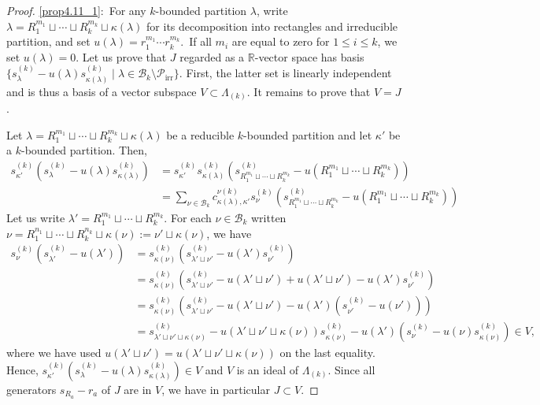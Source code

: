 \documentclass[ALCO,ThmDefs,Unicode,epreuves]{cedram}
\DeclareMathOperator{\irr}{irr}
\begin{document}
\begin{proof}
\eqref{prop4.11_1}:~For any $k$-bounded partition $\lambda$, write $\lambda=R_{1}^{m_{1}}%
\sqcup\cdots\sqcup R_{k}^{m_{k}}\sqcup\kappa(\lambda)$ for its decomposition into
rectangles and irreducible partition, and set $u(\lambda)=r_{1}^{m_{1}}\cdots
r_{k}^{m_{k}}$.\ If all $m_{i}$ are equal to zero for $1\leq i\leq k$, we set $u(\lambda)=0$. Let us prove that $J$ regarded as a $\mathbb{R}$-vector space has basis
$\{s_{\lambda}^{(k)}-u(\lambda)s_{\kappa(\lambda)}^{(k)}\mid\lambda\in \mathcal{B}_{k}\setminus \mathcal{P}_{\irr }\}$. First, the latter set is linearly independent and is thus a basis of a vector subspace $V\subset \Lambda_{(k)}$. It remains to prove that $V=J$. 

Let $\lambda=R_{1}^{m_{1}}%
\sqcup\cdots\sqcup R_{k}^{m_{k}}\sqcup\kappa(\lambda)$ be a reducible $k$-bounded partition and let $\kappa'$ be a $k$-bounded partition. Then,
\begin{align*}
s_{\kappa'}^{(k)} (s_{\lambda}^{(k)}-u(\lambda)s_{\kappa(\lambda)}^{(k)})&=s_{\kappa'}^{(k)}s_{\kappa(\lambda)}^{(k)}\left(s_{R_{1}^{m_{1}}%
\sqcup\cdots\sqcup R_{k}^{m_{k}}}^{(k)}-u(R_{1}^{m_{1}}%
\sqcup\cdots\sqcup R_{k}^{m_{k}})\right)\\
&=\sum_{\nu\in \mathcal{B}_{k}}c_{\kappa(\lambda),\kappa'}^{\nu(k)} s_{\nu}^{(k)}\left(s_{R_{1}^{m_{1}}%
\sqcup\cdots\sqcup R_{k}^{m_{k}}}^{(k)}-u(R_{1}^{m_{1}}%
\sqcup\cdots\sqcup R_{k}^{m_{k}})\right)
\end{align*}
Let us write $\lambda'=R_{1}^{m_{1}}%
\sqcup\cdots\sqcup R_{k}^{m_{k}}$. For each $\nu\in\mathcal{B}_{k}$ written $\nu=R_{1}^{n_{1}}%
\sqcup\cdots\sqcup R_{k}^{n_{k}}\sqcup\kappa(\nu):=\nu'\sqcup \kappa(\nu)$, we have 
\begin{align*}
s_{\nu}^{(k)}(s_{\lambda'}^{(k)}-u(\lambda'))&=s_{\kappa(\nu)}^{(k)}(s_{\lambda'\sqcup \nu'}^{(k)}-u(\lambda')s_{\nu'}^{(k)})\\
&=s_{\kappa(\nu)}^{(k)}\left(s_{\lambda'\sqcup \nu'}^{(k)}-u(\lambda'\sqcup \nu')+u(\lambda'\sqcup \nu')-u(\lambda')s_{\nu'}^{(k)}\right)\\
&=s_{\kappa(\nu)}^{(k)}\left(s_{\lambda'\sqcup \nu'}^{(k)}-u(\lambda'\sqcup \nu')-u(\lambda')(s_{\nu'}^{(k)} -u(\nu'))\right)\\
&=s_{\lambda'\sqcup \nu'\sqcup \kappa(\nu)}^{(k)}-u(\lambda'\sqcup \nu'\sqcup \kappa(\nu))s_{\kappa(\nu)}^{(k)}-u(\lambda')(s_{\nu}^{(k)}-u(\nu)s_{\kappa(\nu)}^{(k)})\in V,
\end{align*}
where we have used $u(\lambda'\sqcup \nu')=u(\lambda'\sqcup \nu'\sqcup \kappa(\nu))$ on the last equality. Hence, $s_{\kappa'}^{(k)} (s_{\lambda}^{(k)}-u(\lambda)s_{\kappa(\lambda)}^{(k)})\in V$ and $V$ is an ideal of $\Lambda_{(k)}$. Since all generators $s_{R_{a}}-r_{a}$ of $J$ are in $V$, we have in particular $J\subset V$. 


\end{proof}
\end{document}
